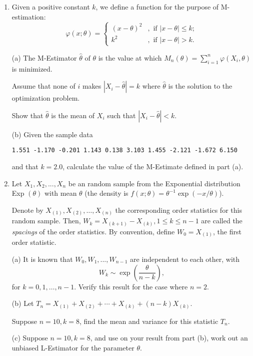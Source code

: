 \begin{enumerate}
\item 
Given a positive constant $k$, we define a function for the purpose
of M-estimation:
\[ 
\varphi(x; \theta) = 
\begin{cases} 
(x - \theta)^{2} &, \text { if } | x - \theta | \leq k; \\ 
k^{2} &, \text { if } | x - \theta | > k. 
\end{cases} 
\] 
 
(a) The M-Estimator $ \hat \theta \text { of } \theta $ is the value at which
$ M_{n} ( \theta ) = \sum_{i=1}^{n} \varphi ( X_{i}, \theta ) $ is minimized. 

Assume that none of $i$ makes $ | X_{i} - \hat \theta | = k $
where $\hat \theta$ is the solution to the optimization problem. 

Show that $\hat \theta$ is the mean of $X_{i}$ such that
$ | X_{i} - \hat \theta | < k $. 

(b) Given the sample data 

\begin{verbatim}
1.551 -1.170 -0.201 1.143 0.138 3.103 1.455 -2.121 -1.672 6.150
\end{verbatim}

and that $ k = 2.0 $, calculate the value of the M-Estimate
defined in part (a). 

\item
Let $ X_{1}, X_{2}, ... , X_{n} $ be an \iid random sample 
from the Exponential distribution 
Exp $(\theta ) $ with mean $ \theta $ 
(the density is $ f (x; \theta) = \theta^{ - 1 } \exp ( - x/\theta ) $). 

Denote by $ X_{ (1) }, X_{ (2) }, \ldots, X_{ (n) } $ 
the corresponding order statistics for this random sample. 
Then, $ W_{k} = X_{ (k+1) } - X_{ (k) }, 1 \leq k \leq n - 1 $ 
are called the {\em spacings } of the order statistics. 
By convention, define $ W_{0} = X_{ (1) } $, the first order statistic. 


(a) It is known that $ W_{0}, W_{1}, ... , W_{n - 1} $ 
are independent to each other, with 
\[ 
W_{k} \sim \exp ( \frac { \theta } { n - k } ),  
\]  
for $ k = 0, 1, \ldots, n - 1 $. 
Verify this result for the case where $ n = 2 $. 

(b) Let $ T_{n} = X_{ (1) } + X_{ (2) } + \cdots + X_{ (k) } + (n - k) X_{ (k) } $. 

Suppose $ n = 10, k = 8 $, find the mean and variance for this statistic $ T_{n} $. 


(c) Suppose $ n = 10, k = 8 $, and use on your result from part (b), 
work out an unbiased L-Estimator for the parameter $ \theta $. 

\end{enumerate}


